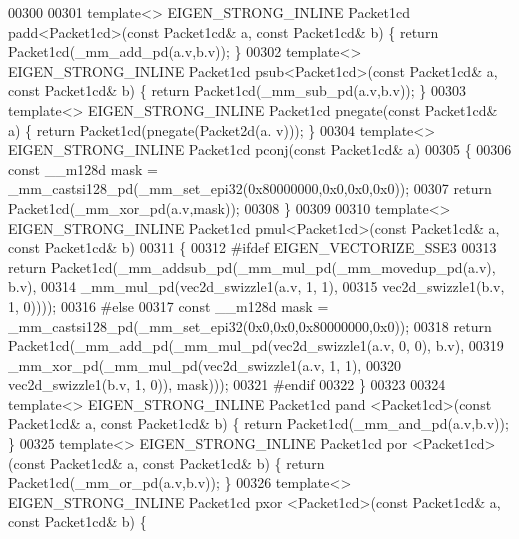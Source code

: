 \begin{DoxyCode}
00300 
00301 \textcolor{keyword}{template}<> EIGEN\_STRONG\_INLINE Packet1cd padd<Packet1cd>(\textcolor{keyword}{const} Packet1cd& a, \textcolor{keyword}{const} Packet1cd& b) \{ \textcolor{keywordflow}{return} 
      Packet1cd(\_mm\_add\_pd(a.v,b.v)); \}
00302 \textcolor{keyword}{template}<> EIGEN\_STRONG\_INLINE Packet1cd psub<Packet1cd>(\textcolor{keyword}{const} Packet1cd& a, \textcolor{keyword}{const} Packet1cd& b) \{ \textcolor{keywordflow}{return} 
      Packet1cd(\_mm\_sub\_pd(a.v,b.v)); \}
00303 \textcolor{keyword}{template}<> EIGEN\_STRONG\_INLINE Packet1cd pnegate(\textcolor{keyword}{const} Packet1cd& a) \{ \textcolor{keywordflow}{return} Packet1cd(pnegate(Packet2d(a.
      v))); \}
00304 \textcolor{keyword}{template}<> EIGEN\_STRONG\_INLINE Packet1cd pconj(\textcolor{keyword}{const} Packet1cd& a)
00305 \{
00306   \textcolor{keyword}{const} \_\_m128d mask = \_mm\_castsi128\_pd(\_mm\_set\_epi32(0x80000000,0x0,0x0,0x0));
00307   \textcolor{keywordflow}{return} Packet1cd(\_mm\_xor\_pd(a.v,mask));
00308 \}
00309 
00310 \textcolor{keyword}{template}<> EIGEN\_STRONG\_INLINE Packet1cd pmul<Packet1cd>(\textcolor{keyword}{const} Packet1cd& a, \textcolor{keyword}{const} Packet1cd& b)
00311 \{
00312 \textcolor{preprocessor}{  #ifdef EIGEN\_VECTORIZE\_SSE3}
00313   \textcolor{keywordflow}{return} Packet1cd(\_mm\_addsub\_pd(\_mm\_mul\_pd(\_mm\_movedup\_pd(a.v), b.v),
00314                                  \_mm\_mul\_pd(vec2d\_swizzle1(a.v, 1, 1),
00315                                             vec2d\_swizzle1(b.v, 1, 0))));
00316 \textcolor{preprocessor}{  #else}
00317   \textcolor{keyword}{const} \_\_m128d mask = \_mm\_castsi128\_pd(\_mm\_set\_epi32(0x0,0x0,0x80000000,0x0));
00318   \textcolor{keywordflow}{return} Packet1cd(\_mm\_add\_pd(\_mm\_mul\_pd(vec2d\_swizzle1(a.v, 0, 0), b.v),
00319                               \_mm\_xor\_pd(\_mm\_mul\_pd(vec2d\_swizzle1(a.v, 1, 1),
00320                                                     vec2d\_swizzle1(b.v, 1, 0)), mask)));
00321 \textcolor{preprocessor}{  #endif}
00322 \}
00323 
00324 \textcolor{keyword}{template}<> EIGEN\_STRONG\_INLINE Packet1cd pand   <Packet1cd>(\textcolor{keyword}{const} Packet1cd& a, \textcolor{keyword}{const} Packet1cd& b) \{ \textcolor{keywordflow}{
      return} Packet1cd(\_mm\_and\_pd(a.v,b.v)); \}
00325 \textcolor{keyword}{template}<> EIGEN\_STRONG\_INLINE Packet1cd por    <Packet1cd>(\textcolor{keyword}{const} Packet1cd& a, \textcolor{keyword}{const} Packet1cd& b) \{ \textcolor{keywordflow}{
      return} Packet1cd(\_mm\_or\_pd(a.v,b.v)); \}
00326 \textcolor{keyword}{template}<> EIGEN\_STRONG\_INLINE Packet1cd pxor   <Packet1cd>(\textcolor{keyword}{const} Packet1cd& a, \textcolor{keyword}{const} Packet1cd& b) \{ \textcolor{keywordflow}{
}
\end{DoxyCode}

